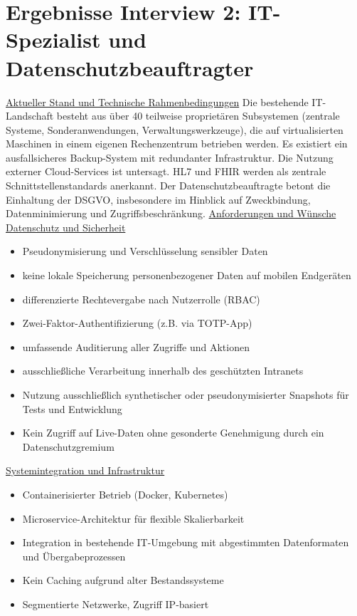 \section{Ergebnisse Interview 2: IT-Spezialist und Datenschutzbeauftragter}
\underline{Aktueller Stand und Technische Rahmenbedingungen}
Die bestehende IT-Landschaft besteht aus über 40 teilweise proprietären Subsystemen (zentrale Systeme, Sonderanwendungen, Verwaltungswerkzeuge), die auf virtualisierten Maschinen in einem eigenen Rechenzentrum betrieben werden. Es existiert ein ausfallsicheres Backup-System mit redundanter Infrastruktur. Die Nutzung externer Cloud-Services ist untersagt. HL7 und FHIR werden als zentrale Schnittstellenstandards anerkannt.
Der Datenschutzbeauftragte betont die Einhaltung der DSGVO, insbesondere im Hinblick auf Zweckbindung, Datenminimierung und Zugriffsbeschränkung.
\underline{Anforderungen und Wünsche}\\
\underline{Datenschutz und Sicherheit}
\begin{itemize}
	\item Pseudonymisierung und Verschlüsselung sensibler Daten
	\item keine lokale Speicherung personenbezogener Daten auf mobilen Endgeräten
	\item differenzierte Rechtevergabe nach Nutzerrolle (RBAC)
	\item Zwei-Faktor-Authentifizierung (z.B. via TOTP-App)
	\item umfassende Auditierung aller Zugriffe und Aktionen
	\item ausschließliche Verarbeitung innerhalb des geschützten Intranets
	\item Nutzung ausschließlich synthetischer oder pseudonymisierter Snapshots für Tests und Entwicklung
	\item Kein Zugriff auf Live-Daten ohne gesonderte Genehmigung durch ein Datenschutzgremium
\end{itemize}
\underline{Systemintegration und Infrastruktur}
\begin{itemize}
	\item Containerisierter Betrieb (Docker, Kubernetes)
	\item Microservice-Architektur für flexible Skalierbarkeit
	\item Integration in bestehende IT-Umgebung mit abgestimmten Datenformaten und Übergabeprozessen
	\item Kein Caching aufgrund alter Bestandssysteme
	\item Segmentierte Netzwerke, Zugriff IP-basiert
\end{itemize}
